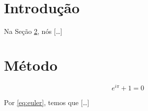 \documentclass{article}
\begin{document}
\section{Introdução}
\label{sec:intro}

Na Seção \ref{sec:metodo}, nós [\ldots]

\section{Método}
\label{sec:metodo}

\begin{equation}
\label{eq:euler}
e^{i\pi} + 1 = 0
\end{equation}

Por \eqref{eq:euler}, temos que [\ldots]
\end{document}
